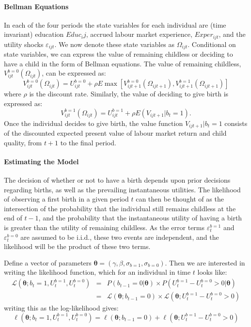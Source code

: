\documentclass[a4paper, 11 pt]{article}
\theoremstyle{plain}
\begin{document}
\begin{spacing}{1.4}
\paragraph{Bellman Equations} In each of the four periods the state variables
for each individual are (time invariant) education $Educ_ij$, accrued labour 
market experience, $Exper_{ijt}$, and the utility shocks $\varepsilon_{ijt}$.  
We now denote these state variables as $\Omega_{ijt}$.  Conditional on state 
variables, we can express the value of remaining childless or deciding to have 
a child in the form of Bellman equations.  The value of remaining childless, 
$V_{ijt}^{b=0}(\Omega_{ijt})$, can be expressed as:
\begin{equation}
\label{beEqn:VF0}
V_{ijt}^{b=0}(\Omega_{ijt})=U_{ijt}^{b=0}+\rho E\max
                         [V_{ijt+1}^{b=0}(\Omega_{ijt+1}),V_{ijt+1}^{b=1}(\Omega_{ijt+1})]
\end{equation}
where $\rho$ is the discount rate.  Similarly, the value of deciding to give 
birth is expressed as:
\begin{equation}
\label{beEqn:VF1}
V_{ijt}^{b=1}(\Omega_{ijt})=U_{ijt}^{b=1}+\rho E(V_{ijt+1}|b_t=1).
\end{equation}
Once the individual decides to give birth, the value function $V_{ijt+1}|b_t=1$
consists of the discounted expected present value of labour market return and 
child quality, from $t+1$ to the final period.

\paragraph{Estimating the Model}
The decision of whether or not to have a birth depends upon prior decisions 
regarding births, as well as the prevailing instantaneous utilities.  The
likelihood of observing a first birth in a given period $t$ can then be thought 
of as the intersection of the probability that the individual still remains 
childless at the end of $t-1$, and the probability that the instantaneous 
utility of having a birth is greater than the utility of remaining childless. As 
the error terms $\varepsilon_t^{b=1}$ and $\varepsilon_t^{b=0}$ are assumed to 
be i.i.d., these two events are independent, and the likelihood will be the 
product of these two terms.

Define a vector of parameters $\bm\theta=(\gamma,\beta,\sigma_{b=1},
\sigma_{b=0})$. Then we are interested in writing the likelihood function, which 
for an individual in time $t$ looks like:
\begin{eqnarray}
\mathcal{L}(\bm\theta;b_t=1,U_t^{b=1},U_t^{b=0})&=&
P(b_{t-1}=0|\bm\theta) \times P(U_t^{b=1}-U_t^{b=0}>0|\bm\theta) \nonumber \\
& = & \mathcal{L}(\bm\theta;b_{t-1}=0)\times 
\mathcal{L}(\bm\theta;U_t^{b=1}-U_t^{b=0}>0) \nonumber
\end{eqnarray}
writing this as the log-likelihood gives:
\begin{equation}
\ell(\bm\theta;b_t=1,U_t^{b=1},U_t^{b=0})= \ell(\bm\theta;b_{t-1}=0) 
+ \ell(\bm\theta;U_t^{b=1}-U_t^{b=0}>0)
\end{equation}


\end{spacing}
\end{document}
